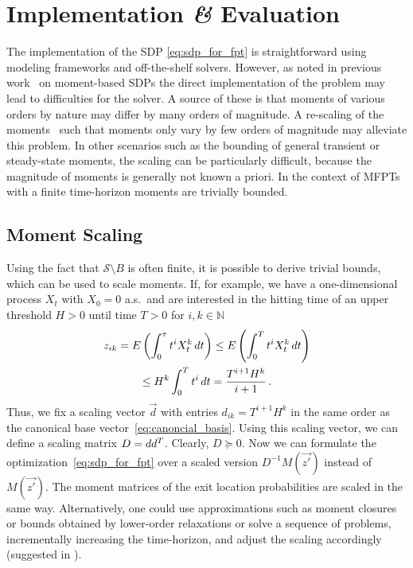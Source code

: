\section{Implementation \textit{\&} Evaluation}\label{sec:mfpt:evaluation}
The implementation of the \ac{SDP} \eqref{eq:sdp_for_fpt} is straightforward using
modeling frameworks and off-the-shelf solvers.
However, as noted in previous work~\parencite{dowdy2018dynamic,sakurai2017convex,dowdy2018bounds,sakurai2019bounding} on moment-based \acp{SDP}
the direct implementation of the problem may lead to difficulties for the solver.
A source of these is that moments of various orders by nature
may differ by many orders of magnitude.
A re-scaling of the moments~\parencite{dowdy2018bounds,sakurai2019bounding}
such that moments only vary by few orders of magnitude
may alleviate this problem.
In other scenarios such as the bounding of general transient or steady-state moments,
the scaling can be particularly difficult,
because the magnitude of moments is generally not known
a priori. In the context of \acp{MFPT} with a finite time-horizon
moments are trivially bounded.

\subsection{Moment Scaling}\label{sec:mfpt:scaling}
Using the fact that
$\mathcal{S}\setminus {B}$ is often finite,
it is possible to derive trivial bounds, which can be used to scale moments.
If, for example, we have a one-dimensional process $X_t$ with $X_0 = 0$ a.s.\ and are interested in the hitting
time of an upper threshold $H>0$ until time $T>0$ for $i,k\in \mathbb N$
\begin{multline*}
z_{ik} = {E}\left(\int_0^{\tau}t^i X_t^k\,dt\right)\leq{E}\left(\int_0^T t^i X_t^k\,dt\right)\\\leq H^k\int_0^T t^i\,dt
=\frac{T^{i+1}H^k}{i+1}\,.
\end{multline*}
Thus, we fix a scaling vector $\vec d$ with entries $d_{ik}={T^{i+1}H^k}$ in
the same order
as the canonical base vector~\eqref{eq:canoncial_basis}.
Using this scaling vector, we can define a scaling
matrix $D={d}{d}^{T}$.
Clearly, $D \succeq 0$.
Now we can formulate the optimization~\eqref{eq:sdp_for_fpt}
over a scaled version $D^{-1}M(\vec{z'})$ instead of $M(\vec{z'})$.
The moment matrices of the exit location probabilities are scaled in the same
way.
Alternatively, one could use approximations such as moment closures
or bounds obtained by lower-order relaxations or solve a sequence
of problems, incrementally increasing
the time-horizon, and adjust the scaling accordingly (suggested in \citet{dowdy2018dynamic}).


